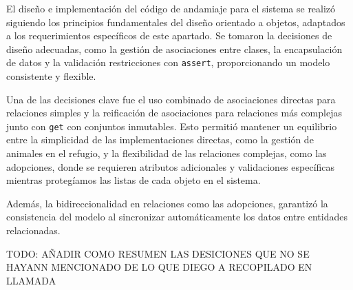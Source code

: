 El diseño e implementación del código de andamiaje para el sistema se realizó siguiendo 
los principios fundamentales del diseño orientado a objetos, adaptados a los requerimientos 
específicos de este apartado. Se tomaron la decisiones de diseño adecuadas, como la gestión 
de asociaciones entre clases, la encapsulación de datos y la validación restricciones con \texttt{assert}, 
proporcionando un modelo consistente y flexible.\par
\vspace{0.15cm}
Una de las decisiones clave fue el uso combinado de asociaciones directas para relaciones 
simples y la reificación de asociaciones para relaciones más complejas junto con \texttt{get}
con conjuntos inmutables. Esto permitió mantener un equilibrio entre la simplicidad de las 
implementaciones directas, como la gestión de animales en el refugio, y la flexibilidad 
de las relaciones complejas, como las adopciones, donde se requieren atributos adicionales 
y validaciones específicas mientras protegíamos las listas de cada objeto en el sistema.\par
\vspace{0.15cm}
Además, la bidireccionalidad en relaciones como las adopciones, garantizó la 
consistencia del modelo al sincronizar automáticamente los datos entre entidades 
relacionadas.\par
TODO: AÑADIR COMO RESUMEN LAS DESICIONES QUE NO SE HAYANN  MENCIONADO DE LO QUE DIEGO A RECOPILADO EN LLAMADA

\newpage
